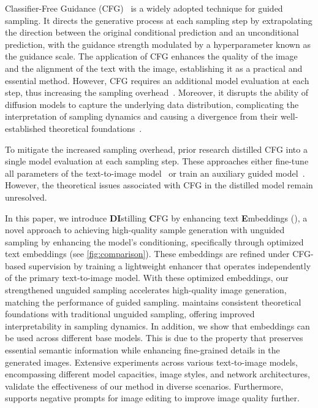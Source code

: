 Classifier-Free Guidance (CFG)~\cite{ho2022classifier} is a widely adopted technique for guided sampling. It directs the generative process at each sampling step by extrapolating the direction between the original conditional prediction and an unconditional prediction, with the guidance strength modulated by a hyperparameter known as the guidance scale. The application of CFG enhances the quality of the image and the alignment of the text with the image, establishing it as a practical and essential method. However, CFG requires an additional model evaluation at each step, thus increasing the sampling overhead~\cite{ho2022classifier}. Moreover, it disrupts the ability of diffusion models to capture the underlying data distribution, complicating the interpretation of sampling dynamics and causing a divergence from their well-established theoretical foundations~\cite{karras2024guiding,zheng2024characteristic,bradley2024classifier}. 

To mitigate the increased sampling overhead, prior research distilled CFG into a single model evaluation at each sampling step. These approaches either fine-tune all parameters of the text-to-image model~\cite{meng2023distillation,li2024snapfusion} or train an auxiliary guided model~\cite{hsiao2024plug}. However, the theoretical issues associated with CFG in the distilled model remain unresolved. 


In this paper, we introduce \textbf{D}\textbf{I}stilling \textbf{C}FG by enhancing text \textbf{E}mbeddings (\ourName), a novel approach to achieving high-quality sample generation with unguided sampling by enhancing the model's conditioning, specifically through optimized text embeddings (see \cref{fig:comparison}). These embeddings are refined under CFG-based supervision by training a lightweight enhancer that operates independently of the primary text-to-image model. With these optimized embeddings, our strengthened unguided sampling accelerates high-quality image generation, matching the performance of guided sampling. \ourName maintains consistent theoretical foundations with traditional unguided sampling, offering improved interpretability in sampling dynamics. In addition, we show that \ourName embeddings can be used across different base models. This is due to the property that \ourName preserves essential semantic information while enhancing fine-grained details in the generated images. Extensive experiments across various text-to-image models, encompassing different model capacities, image styles, and network architectures, validate the effectiveness of our method in diverse scenarios. Furthermore, \ourName supports negative prompts for image editing to improve image quality further. 


